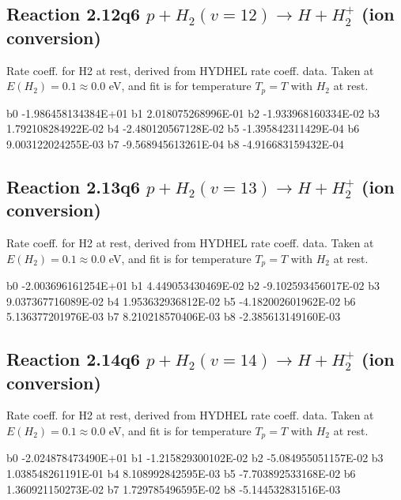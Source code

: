 \newpage
\subsection{
Reaction 2.12q6
$ p + H_2(v=12) \rightarrow H + H_2^+$ (ion conversion)
}
Rate coeff. for H2 at rest, derived from HYDHEL rate coeff. data.
Taken at $E(H_2) = 0.1 \approx 0.0$ eV,  and fit is for temperature $T_p=T$ with $H_2$ at rest.

\begin{{small}}\begin{{verbatim}}

  b0 -1.986458134384E+01  b1  2.018075268996E-01  b2 -1.933968160334E-02
  b3  1.792108284922E-02  b4 -2.480120567128E-02  b5 -1.395842311429E-04
  b6  9.003122024255E-03  b7 -9.568945613261E-04  b8 -4.916683159432E-04

\end{{verbatim}}\end{{small}}

\newpage
\subsection{
Reaction 2.13q6
$ p + H_2(v=13) \rightarrow H + H_2^+$ (ion conversion)
}
Rate coeff. for H2 at rest, derived from HYDHEL rate coeff. data.
Taken at $E(H_2) = 0.1 \approx 0.0$ eV,  and fit is for temperature $T_p=T$ with $H_2$ at rest.

\begin{{small}}\begin{{verbatim}}

  b0 -2.003696161254E+01  b1  4.449053430469E-02  b2 -9.102593456017E-02
  b3  9.037367716089E-02  b4  1.953632936812E-02  b5 -4.182002601962E-02
  b6  5.136377201976E-03  b7  8.210218570406E-03  b8 -2.385613149160E-03

\end{{verbatim}}\end{{small}}

\newpage
\subsection{
Reaction 2.14q6
$ p + H_2(v=14) \rightarrow H + H_2^+$ (ion conversion)
}
Rate coeff. for H2 at rest, derived from HYDHEL rate coeff. data.
Taken at $E(H_2) = 0.1 \approx 0.0$ eV,  and fit is for temperature $T_p=T$ with $H_2$ at rest.

\begin{{small}}\begin{{verbatim}}

  b0 -2.024878473490E+01  b1 -1.215829300102E-02  b2 -5.084955051157E-02
  b3  1.038548261191E-01  b4  8.108992842595E-03  b5 -7.703892533168E-02
  b6  1.360921150273E-02  b7  1.729785496595E-02  b8 -5.144532831516E-03

\end{{verbatim}}\end{{small}}

\newpage
